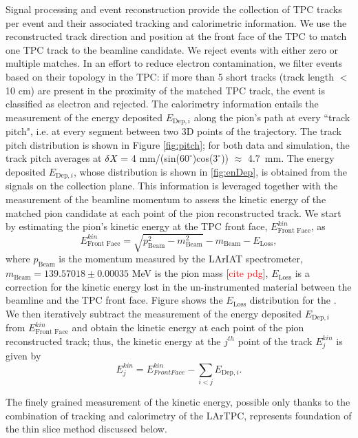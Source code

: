 \documentclass[aps,prl,twocolumn,showpacs,superscriptaddress,groupedaddress]{revtex4}  %
\begin{document}
Signal processing and event reconstruction provide the collection of TPC tracks per event and their associated tracking and calorimetric information. We use the reconstructed track direction and position at the front face of the TPC to match one TPC track to the beamline candidate. We reject events with either zero or multiple matches. In an effort to reduce electron contamination, we filter events based on their topology in the TPC: if more than 5 short tracks (track length $<$ 10 cm) are present in the proximity of the matched TPC track, the event is classified as electron and rejected. The calorimetry information entails the measurement of the energy deposited $E_{\text{Dep},i}$ along the pion's path at every ``track pitch", i.e. at every segment between two 3D points of the trajectory. The track pitch distribution is shown in Figure \ref{fig:pitch}; for both data and simulation, the track pitch averages at $\delta {\emph{X}}$ = 4 mm/(sin($60^{\circ}$)cos($3^{\circ}$)) $\approx$ 4.7~mm. 
The energy deposited $E_{\text{Dep},i}$, whose distribution is shown in \ref{fig:enDep}, is obtained from the signals on the collection plane.  This information is leveraged together with the measurement of the beamline momentum to assess the kinetic energy of the matched pion candidate at each point of the pion reconstructed track. We start by estimating the pion's  kinetic energy at the TPC front face, $ E^{kin}_{\text{Front Face}}$, as 
\begin{equation}
 E^{kin}_{\text{Front Face}}  = \sqrt{p^2_{\text{Beam}} - m^2_{\text{Beam}}} - m_{\text{Beam}} - E_{\text{Loss}},
\label{eq:enFF}
\end{equation}
where $p_{\text{Beam}}$ is the momentum measured by the LArIAT spectrometer, $m_{\text{Beam}} = 139.57018\pm0.00035$ MeV is the pion mass [\textcolor{red}{cite pdg}], $E_{\text{Loss}}$ is a correction for the kinetic energy lost in the un-instrumented material between the beamline and the TPC front face. Figure shows the $E_{\text{Loss}}$ distribution for the . We then iteratively subtract the measurement of the energy deposited $E_{\text{Dep},i}$ from $ E^{kin}_{\text{Front Face}}$ and obtain the kinetic energy at each point of the pion reconstructed track; thus, the kinetic energy at the $j^{th}$ point of the track  $E_{j}^{kin}$ is given by
\begin{equation}
 E_{j}^{kin} =  E^{kin}_{Front Face} - \sum_{i < j} E_{\text{Dep},i}.
\label{eq:KEj}
\end{equation}

The finely grained measurement of the kinetic energy, possible only thanks to the combination of tracking and calorimetry of the LArTPC, represents foundation of the thin slice method discussed below.\\
\end{document}
